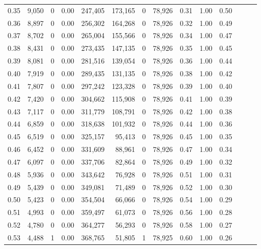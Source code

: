 \begin{tabular}{rrrrrrrrrrrrrr}
0.35 &  9,050 &      0 &  0.00 &  247,405 &  173,165 &       0 &  78,926 &  0.31 &  1.00 &      0.50 \\
0.36 &  8,897 &      0 &  0.00 &  256,302 &  164,268 &       0 &  78,926 &  0.32 &  1.00 &      0.49 \\
0.37 &  8,702 &      0 &  0.00 &  265,004 &  155,566 &       0 &  78,926 &  0.34 &  1.00 &      0.47 \\
0.38 &  8,431 &      0 &  0.00 &  273,435 &  147,135 &       0 &  78,926 &  0.35 &  1.00 &      0.45 \\
0.39 &  8,081 &      0 &  0.00 &  281,516 &  139,054 &       0 &  78,926 &  0.36 &  1.00 &      0.44 \\
0.40 &  7,919 &      0 &  0.00 &  289,435 &  131,135 &       0 &  78,926 &  0.38 &  1.00 &      0.42 \\
0.41 &  7,807 &      0 &  0.00 &  297,242 &  123,328 &       0 &  78,926 &  0.39 &  1.00 &      0.40 \\
0.42 &  7,420 &      0 &  0.00 &  304,662 &  115,908 &       0 &  78,926 &  0.41 &  1.00 &      0.39 \\
0.43 &  7,117 &      0 &  0.00 &  311,779 &  108,791 &       0 &  78,926 &  0.42 &  1.00 &      0.38 \\
0.44 &  6,859 &      0 &  0.00 &  318,638 &  101,932 &       0 &  78,926 &  0.44 &  1.00 &      0.36 \\
0.45 &  6,519 &      0 &  0.00 &  325,157 &   95,413 &       0 &  78,926 &  0.45 &  1.00 &      0.35 \\
0.46 &  6,452 &      0 &  0.00 &  331,609 &   88,961 &       0 &  78,926 &  0.47 &  1.00 &      0.34 \\
0.47 &  6,097 &      0 &  0.00 &  337,706 &   82,864 &       0 &  78,926 &  0.49 &  1.00 &      0.32 \\
0.48 &  5,936 &      0 &  0.00 &  343,642 &   76,928 &       0 &  78,926 &  0.51 &  1.00 &      0.31 \\
0.49 &  5,439 &      0 &  0.00 &  349,081 &   71,489 &       0 &  78,926 &  0.52 &  1.00 &      0.30 \\
0.50 &  5,423 &      0 &  0.00 &  354,504 &   66,066 &       0 &  78,926 &  0.54 &  1.00 &      0.29 \\
0.51 &  4,993 &      0 &  0.00 &  359,497 &   61,073 &       0 &  78,926 &  0.56 &  1.00 &      0.28 \\
0.52 &  4,780 &      0 &  0.00 &  364,277 &   56,293 &       0 &  78,926 &  0.58 &  1.00 &      0.27 \\
0.53 &  4,488 &      1 &  0.00 &  368,765 &   51,805 &       1 &  78,925 &  0.60 &  1.00 &      0.26 \\

\end{tabular}
